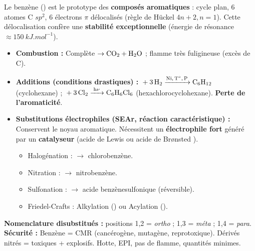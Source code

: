 \documentclass[11pt]{article}
\begin{document}
\begin{aretenir}
Le benzène () est le prototype des \textbf{composés aromatiques} : cycle plan, 6 atomes C $sp^2$, 6 électrons $\pi$ délocalisés (règle de Hückel $4n+2, n=1$). Cette délocalisation confère une \textbf{stabilité exceptionnelle} (énergie de résonance $\approx \SI{150}{kJ.mol^{-1}}$).
\begin{itemize}
\item \textbf{Combustion :} Complète $\rightarrow \ce{CO2} + \ce{H2O}$ ; flamme très fuligineuse (excès de C).
\item \textbf{Additions (conditions drastiques) :} $\ce{+ 3 H2 ->[Ni, T^\circ, P] C6H12}$ (cyclohexane) ; $\ce{+ 3 Cl2 ->[h\nu] C6H6Cl6}$ (hexachlorocyclohexane). \textbf{Perte de l'aromaticité}.
\item \textbf{Substitutions électrophiles (SEAr, réaction caractéristique) :} Conservent le noyau aromatique. Nécessitent un \textbf{électrophile fort} généré par un \textbf{catalyseur} (acide de Lewis  ou acide de Brønsted ).
\begin{itemize}
\item Halogénation :  $\rightarrow$ chlorobenzène.
\item Nitration :  $\rightarrow$ nitrobenzène.
\item Sulfonation :  $\rightarrow$ acide benzènesulfonique (réversible).
\item Friedel-Crafts : Alkylation () ou Acylation ().
\end{itemize}
\end{itemize}
\textbf{Nomenclature disubstitués :} positions 1,2 = \emph{ortho} ; 1,3 = \emph{méta} ; 1,4 = \emph{para}.
\textbf{Sécurité :} Benzène = CMR (cancérogène, mutagène, reprotoxique). Dérivés nitrés = toxiques + explosifs. Hotte, EPI, pas de flamme, quantités minimes.
\end{aretenir}
\end{document}
